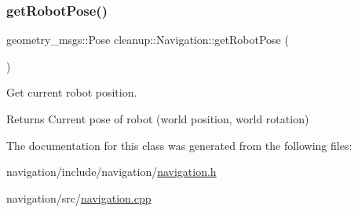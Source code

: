 \subsubsection{\texorpdfstring{get\+Robot\+Pose()}{getRobotPose()}}
{\footnotesize\ttfamily geometry\+\_\+msgs\+::\+Pose cleanup\+::\+Navigation\+::get\+Robot\+Pose (\begin{DoxyParamCaption}{ }\end{DoxyParamCaption})}



Get current robot position. 

\begin{DoxyReturn}{Returns}
Current pose of robot (world position, world rotation) 
\end{DoxyReturn}


The documentation for this class was generated from the following files\+:\begin{DoxyCompactItemize}
\item 
navigation/include/navigation/\hyperlink{navigation_8h}{navigation.\+h}\item 
navigation/src/\hyperlink{navigation_8cpp}{navigation.\+cpp}\end{DoxyCompactItemize}
